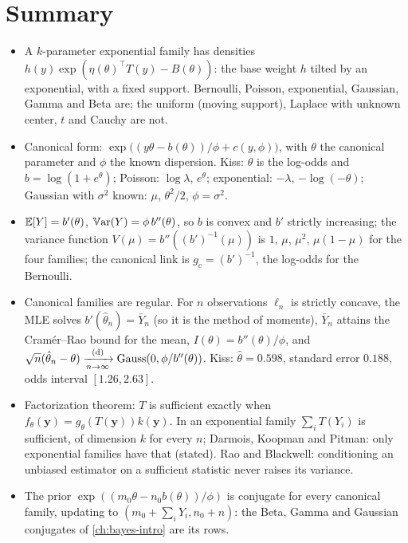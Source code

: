 \section{Summary}
\label{sec:ef-summary}

\begin{itemize}[nosep]
\item A $k$-parameter exponential family has densities $h(y)\exp(\eta(\theta)^\top T(y) - B(\theta))$: the base weight $h$ tilted by an exponential, with a fixed support. Bernoulli, Poisson, exponential, Gaussian, Gamma and Beta are; the uniform (moving support), Laplace with unknown center, $t$ and Cauchy are not.
\item Canonical form: $\exp\big((y\theta - b(\theta))/\phi + c(y, \phi)\big)$, with $\theta$ the canonical parameter and $\phi$ the known dispersion. Kiss: $\theta$ is the log-odds and $b = \log(1 + e^\theta)$; Poisson: $\log\lambda$, $e^\theta$; exponential: $-\lambda$, $-\log(-\theta)$; Gaussian with $\sigma^2$ known: $\mu$, $\theta^2/2$, $\phi = \sigma^2$.
\item $\operatorname*{\mathbb{E}}[Y] = b'(\theta)$, $\operatorname*{\mathbb{V}\text{ar}}(Y) = \phi\,b''(\theta)$, so $b$ is convex and $b'$ strictly increasing; the variance function $V(\mu) = b''((b')^{-1}(\mu))$ is $1$, $\mu$, $\mu^2$, $\mu(1 - \mu)$ for the four families; the canonical link is $g_c = (b')^{-1}$, the log-odds for the Bernoulli.
\item Canonical families are regular. For $n$ observations $\ell_n$ is strictly concave, the MLE solves $b'(\hat{\theta}_n) = \bar{Y}_n$ (so it is the method of moments), $\bar{Y}_n$ attains the Cram\'er--Rao bound for the mean, $I(\theta) = b''(\theta)/\phi$, and $\sqrt{n}(\hat{\theta}_n - \theta) \xrightarrow [n \to \infty ]{\text{(d)}} \text{Gauss}(0, \phi/b''(\theta))$. Kiss: $\hat{\theta} = 0.598$, standard error $0.188$, odds interval $[1.26, 2.63]$.
\item Factorization theorem: $T$ is sufficient exactly when $f_\theta(\mathbf{y}) = g_\theta(T(\mathbf{y}))k(\mathbf{y})$. In an exponential family $\sum_i T(Y_i)$ is sufficient, of dimension $k$ for every $n$; Darmois, Koopman and Pitman: only exponential families have that (stated). Rao and Blackwell: conditioning an unbiased estimator on a sufficient statistic never raises its variance.
\item The prior $\exp((m_0\theta - n_0b(\theta))/\phi)$ is conjugate for every canonical family, updating to $(m_0 + \sum_i Y_i, n_0 + n)$: the Beta, Gamma and Gaussian conjugates of \cref{ch:bayes-intro} are its rows.
\end{itemize}

